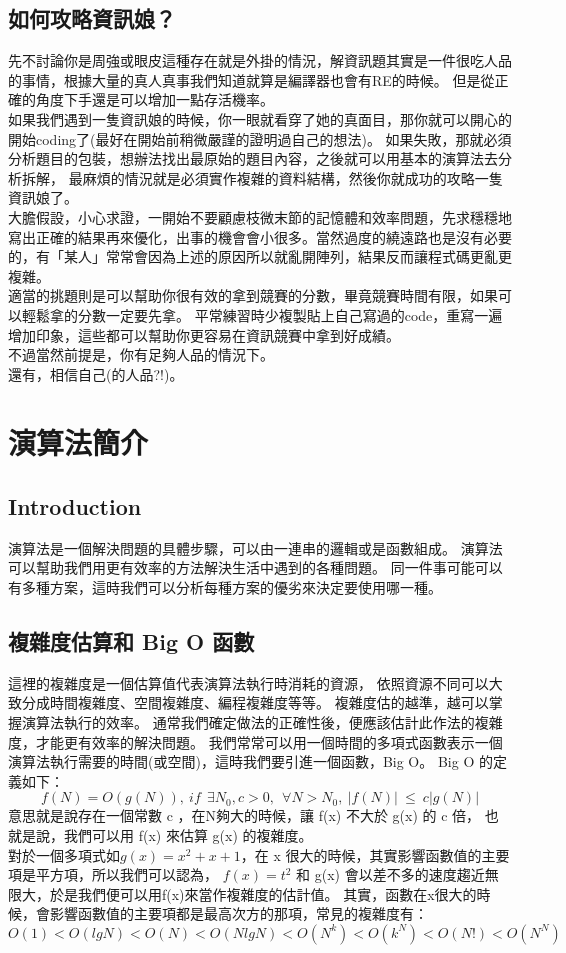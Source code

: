 \documentclass{article}
\begin{document}
\subsection{如何攻略資訊娘？}
先不討論你是周強或眼皮這種存在就是外掛的情況，解資訊題其實是一件很吃人品的事情，根據大量的真人真事我們知道就算是編譯器也會有RE的時候。
但是從正確的角度下手還是可以增加一點存活機率。\\
如果我們遇到一隻資訊娘的時候，你一眼就看穿了她的真面目，那你就可以開心的開始coding了(最好在開始前稍微嚴謹的證明過自己的想法)。
如果失敗，那就必須分析題目的包裝，想辦法找出最原始的題目內容，之後就可以用基本的演算法去分析拆解，
最麻煩的情況就是必須實作複雜的資料結構，然後你就成功的攻略一隻資訊娘了。\\
大膽假設，小心求證，一開始不要顧慮枝微末節的記憶體和效率問題，先求穩穩地寫出正確的結果再來優化，出事的機會會小很多。當然過度的繞遠路也是沒有必要的，有「某人」常常會因為上述的原因所以就亂開陣列，結果反而讓程式碼更亂更複雜。\\
適當的挑題則是可以幫助你很有效的拿到競賽的分數，畢竟競賽時間有限，如果可以輕鬆拿的分數一定要先拿。
平常練習時少複製貼上自己寫過的code，重寫一遍增加印象，這些都可以幫助你更容易在資訊競賽中拿到好成績。\\
不過當然前提是，你有足夠人品的情況下。\\
還有，相信自己(的人品?!)。\\


\section{演算法簡介}

\subsection{Introduction}
演算法是一個解決問題的具體步驟，可以由一連串的邏輯或是函數組成。
演算法可以幫助我們用更有效率的方法解決生活中遇到的各種問題。
同一件事可能可以有多種方案，這時我們可以分析每種方案的優劣來決定要使用哪一種。

\subsection{複雜度估算和 Big O 函數}
這裡的複雜度是一個估算值代表演算法執行時消耗的資源，
依照資源不同可以大致分成時間複雜度、空間複雜度、編程複雜度等等。
複雜度估的越準，越可以掌握演算法執行的效率。
通常我們確定做法的正確性後，便應該估計此作法的複雜度，才能更有效率的解決問題。
我們常常可以用一個時間的多項式函數表示一個演算法執行需要的時間(或空間)，這時我們要引進一個函數，Big O。
Big O 的定義如下：\[f(N) = O(g(N)),\ if\ \ \exists N_0,c > 0,\ \ \forall N > N_0,\ |f(N)|\ ≤\ c|g(N)|\]
意思就是說存在一個常數 c ，在N夠大的時候，讓 f(x) 不大於 g(x) 的 c 倍，
也就是說，我們可以用 f(x) 來估算 g(x) 的複雜度。\\
對於一個多項式如$g(x) = x^2 + x + 1$，在 x 很大的時候，其實影響函數值的主要項是平方項，所以我們可以認為，
$f(x) = t^2$ 和 g(x) 會以差不多的速度趨近無限大，於是我們便可以用f(x)來當作複雜度的估計值。
其實，函數在x很大的時候，會影響函數值的主要項都是最高次方的那項，常見的複雜度有：
\[O(1) < O(lg N) < O(N) < O(N lg N) < O(N^k) < O(k^N ) < O(N!) < O(N^N)\]
\end{document}
